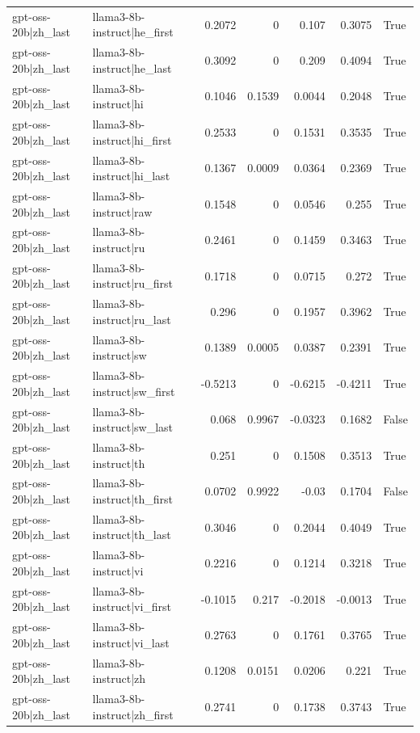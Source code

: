 \begin{table}
\begin{tabular}{l l r r r r l}
gpt-oss-20b|zh_last & llama3-8b-instruct|he_first & 0.2072 & 0 & 0.107 & 0.3075 & True \\
gpt-oss-20b|zh_last & llama3-8b-instruct|he_last & 0.3092 & 0 & 0.209 & 0.4094 & True \\
gpt-oss-20b|zh_last & llama3-8b-instruct|hi & 0.1046 & 0.1539 & 0.0044 & 0.2048 & True \\
gpt-oss-20b|zh_last & llama3-8b-instruct|hi_first & 0.2533 & 0 & 0.1531 & 0.3535 & True \\
gpt-oss-20b|zh_last & llama3-8b-instruct|hi_last & 0.1367 & 0.0009 & 0.0364 & 0.2369 & True \\
gpt-oss-20b|zh_last & llama3-8b-instruct|raw & 0.1548 & 0 & 0.0546 & 0.255 & True \\
gpt-oss-20b|zh_last & llama3-8b-instruct|ru & 0.2461 & 0 & 0.1459 & 0.3463 & True \\
gpt-oss-20b|zh_last & llama3-8b-instruct|ru_first & 0.1718 & 0 & 0.0715 & 0.272 & True \\
gpt-oss-20b|zh_last & llama3-8b-instruct|ru_last & 0.296 & 0 & 0.1957 & 0.3962 & True \\
gpt-oss-20b|zh_last & llama3-8b-instruct|sw & 0.1389 & 0.0005 & 0.0387 & 0.2391 & True \\
gpt-oss-20b|zh_last & llama3-8b-instruct|sw_first & -0.5213 & 0 & -0.6215 & -0.4211 & True \\
gpt-oss-20b|zh_last & llama3-8b-instruct|sw_last & 0.068 & 0.9967 & -0.0323 & 0.1682 & False \\
gpt-oss-20b|zh_last & llama3-8b-instruct|th & 0.251 & 0 & 0.1508 & 0.3513 & True \\
gpt-oss-20b|zh_last & llama3-8b-instruct|th_first & 0.0702 & 0.9922 & -0.03 & 0.1704 & False \\
gpt-oss-20b|zh_last & llama3-8b-instruct|th_last & 0.3046 & 0 & 0.2044 & 0.4049 & True \\
gpt-oss-20b|zh_last & llama3-8b-instruct|vi & 0.2216 & 0 & 0.1214 & 0.3218 & True \\
gpt-oss-20b|zh_last & llama3-8b-instruct|vi_first & -0.1015 & 0.217 & -0.2018 & -0.0013 & True \\
gpt-oss-20b|zh_last & llama3-8b-instruct|vi_last & 0.2763 & 0 & 0.1761 & 0.3765 & True \\
gpt-oss-20b|zh_last & llama3-8b-instruct|zh & 0.1208 & 0.0151 & 0.0206 & 0.221 & True \\
gpt-oss-20b|zh_last & llama3-8b-instruct|zh_first & 0.2741 & 0 & 0.1738 & 0.3743 & True \\

\end{tabular}
\end{table}
